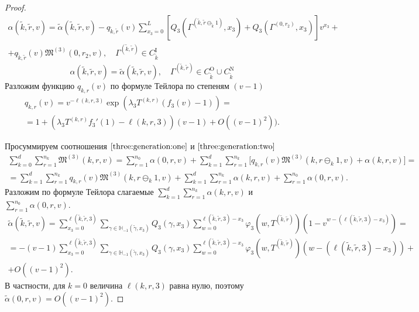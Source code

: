 \documentclass{report}
\begin{document}
\begin{proof}
\begin{multline}
\alpha(\tilde{k},\tilde{r},v) =\tilde{\alpha}(\tilde{k},\tilde{r},v) - q_{\tilde{k},\tilde{r}}(v)\sum_{x_3=0}^{L} \left[ Q_3(\Gamma^{(\tilde{k},\tilde{r}\ominus_{\tilde{k}} 1)},x_3) + Q_3(\Gamma^{(0,r_2)},x_3) \right] v^{x_3}+ \\ 
+ q_{\tilde{k},\tilde{r}}(v)  \mathfrak{M}^{(3)}(0,r_2,v), \quad \Gamma^{(\tilde{k}, \tilde{r})} \in C_{\tilde{k}}^{\mathrm{I}}
\end{multline}
\begin{equation}
\alpha(\tilde{k},\tilde{r},v) =\tilde{\alpha}(\tilde{k},\tilde{r},v), \quad \Gamma^{(\tilde{k}, \tilde{r})} \in C_{\tilde{k}}^{\mathrm{O}} \cup C_{\tilde{k}}^{\mathrm{N}}
\end{equation}
Разложим функцию $q_{k,r}(v)$ по формуле Тейлора по степеням $(v-1)$
\begin{multline*}
    q_{k,r}(v) =  v^{-\ell(k,r,3)} \exp{(\lambda_3 T^{(k,r)} (f_3(v)-1))}= \\=1 + (\lambda_3 T^{(k,r)} f_3'(1) - \ell(k,r,3))(v-1) + O((v-1)^2)).
\end{multline*}

Просуммируем соотношения $\eqref{three:generation:one}$ и $\eqref{three:generation:two}$
\begin{multline}
 \sum_{k=0}^{d} \sum_{r=1}^{n_k} \mathfrak{M}^{(3)}(k,r,v) = \sum_{r=1}^{n_0} \alpha (0,r,v) + \sum_{k=1}^{d}\sum_{r=1}^{n_k} \bigl[ q_{k,r}(v) \mathfrak{M}^{(3)}(k,r\ominus_k 1,v) + \alpha(k,r,v)\bigr] = \\
 = \sum_{k=1}^{d}\sum_{r=1}^{n_k} q_{k,r}(v) \mathfrak{M}^{(3)}(k,r\ominus_k 1,v)   + \sum_{k=1}^{d}\sum_{r=1}^{n_k} \alpha(k,r,v)  + \sum_{r=1}^{n_0} \alpha (0,r,v).
 \label{summed:neccessary}
\end{multline}
Разложим по формуле Тейлора слагаемые $\sum_{k=1}^{d}\sum_{r=1}^{n_k} \alpha(k,r,v)$ и $\sum_{r=1}^{n_0} \alpha (0,r,v)$.
\begin{multline*}
    \tilde{\alpha} (\tilde{k},\tilde{r},v) = \sum_{x_3=0}^{\ell(\tilde{k},\tilde{r},3)}\sum_{\gamma \in {\mathbb H}_{-1}(\tilde{\gamma},x_3)} Q_3(\gamma,x_3) \sum_{w=0}^{\ell(\tilde{k},\tilde{r},3) - x_3} \varphi_3(w,T^{(\tilde{k},\tilde{r})}) (1-v^{w-(\ell(\tilde{k},\tilde{r},3)-x_3)})=\\= - (v-1) \sum_{x_3=0}^{\ell(\tilde{k},\tilde{r},3)}\sum_{\gamma \in {\mathbb H}_{-1}(\tilde{\gamma},x_3)} Q_3(\gamma,x_3) \sum_{w=0}^{\ell(\tilde{k},\tilde{r},3) - x_3} \varphi_3(w,T^{(\tilde{k},\tilde{r})}) (w-(\ell(\tilde{k},\tilde{r},3)-x_3)) + \\ + O((v-1)^2).
\end{multline*}
В частности, для $k=0$ величина $\ell(k,r,3)$ равна нулю, поэтому $\tilde{\alpha} (0,r,v) = O((v-1)^2)$.


\end{proof}
\end{document}
